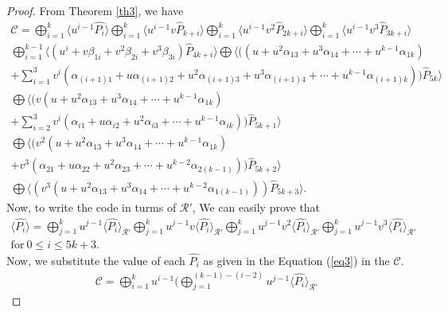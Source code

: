 \documentclass[10pt,a4paper]{amsart}
\begin{document}
 \begin{proof}
		From Theorem \ref{th3}, we have
  \allowdisplaybreaks
  \begin{gather*}
		\mathcal{C}= \bigoplus_{i=1}^{k}\langle u^{i-1}\hat{P_{i}}\rangle \bigoplus_{i=1}^{k}\langle u^{i-1}v\hat{P}_{k+i}\rangle \bigoplus_{i=1}^{k}\langle u^{i-1}v^2\hat{P}_{2k+i}\rangle  \bigoplus_{i=1}^{k}\langle u^{i-1}v^3\hat{P}_{3k+i}\rangle \\
        \bigoplus_{i=1}^{k-1} \langle (u^i+ v\beta_{1i} + v^2\beta_{2i} + v^3\beta_{3i})\hat{P}_{4k+i}\rangle   \bigoplus \langle ((u + u^2\alpha_{13} + u^3\alpha_{14} + \cdots + u^{k-1}\alpha_{1k}) \\
      + \sum_{i=1}^{3} v^i( \alpha_{(i+1)1} + u\alpha_{(i+1)2} + u^2\alpha_{(i+1)3} + u^3\alpha_{(i+1)4} + \cdots + u^{k-1}\alpha_{(i+1)k} ))\hat{P}_{5k}\rangle
     \\  \bigoplus  \langle (v(u + u^2\alpha_{13} + u^3\alpha_{14} + \cdots + u^{k-1}\alpha_{1k})  \\+ \sum_{i=2}^{3} v^i( \alpha_{i1} + u\alpha_{i2} + u^2\alpha_{i3} + \cdots + u^{k-1}\alpha_{ik} ))\hat{P}_{5k+1} \rangle
     \\  \bigoplus  \langle (v^2(u + u^2\alpha_{13} + u^3\alpha_{14} + \cdots + u^{k-1}\alpha_{1k})
     \\+ v^3( \alpha_{21} + u\alpha_{22} + u^2\alpha_{23} + \cdots + u^{k-2}\alpha_{2(k-1)}))\hat{P}_{5k+2}\rangle
     \\  \bigoplus \langle (v^3(u + u^2\alpha_{13} + u^3\alpha_{14} + \cdots + u^{k-2}\alpha_{1(k-1)}))\hat{P}_{5k+3}\rangle. 
		\end{gather*}
        {Now, to write the code in turms of $\mathcal{R}'$, We can easily prove that}
 \allowdisplaybreaks
  \begin{gather} \label{eq3}
		\langle \hat{P_i} \rangle =  \bigoplus_{j=1}^{k}  u^{j-1}\langle \hat{P_i} \rangle_{\mathcal{R}'}
      \bigoplus_{j=1}^{k}  u^{j-1}v\langle \hat{P_i} \rangle_{\mathcal{R}'}
      \bigoplus_{j=1}^{k}  u^{j-1}v^2\langle \hat{P_i} \rangle_{\mathcal{R}'}
      \bigoplus_{j=1}^{k}  u^{j-1}v^3\langle \hat{P_i} \rangle_{\mathcal{R}'} \nonumber\\
      \text{for} ~0 \leq i \leq 5k+3.
		\end{gather}
        {Now, we substitute the value of each $\hat{P_i}$ as given in the Equation (\ref{eq3}) in the $\mathcal{C}$. } 
   \allowdisplaybreaks
  \begin{gather*}
		\mathcal{C}= \bigoplus_{i=1}^{k} u^{i-1} ( \bigoplus_{j=1}^{(k-1)-(i-2)}  u^{j-1}\langle \hat{P_i} \rangle_{\mathcal{R}'}

\end{gather*}
\end{proof}
\end{document}
